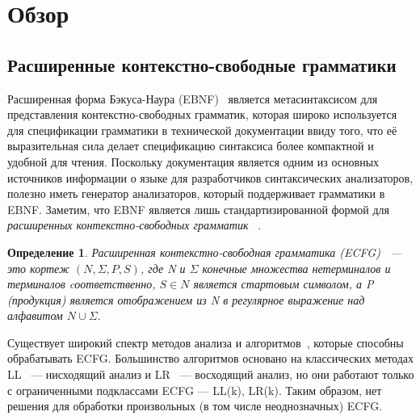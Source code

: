 \documentclass[12pt]{matmex-diploma-custom}
\newtheorem{mydef}{Определение}
\begin{document}
	\section{Обзор}
	
	\subsection{Расширенные контекстно-свободные грамматики}
	
	Расширенная форма Бэкуса-Наура (EBNF)~\cite{EBNFISO} является метасинтаксисом для представления 
	контекстно-свободных грамматик, которая широко используется для спецификации грамматики в технической документации
	ввиду того, что её выразительная сила делает спецификацию синтаксиса более компактной
	и удобной для чтения. Поскольку документация является одним из основных источников информации
	о языке для разработчиков синтаксических анализаторов, полезно иметь генератор
	анализаторов, который поддерживает грамматики в EBNF. Заметим, что EBNF является 
	лишь стандартизированной формой для \textit{расширенных контекстно-свободных грамматик}
	~\cite{ECFG}.
	
	\begin{mydef}
		Расширенная контекстно-свободная грамматика (ECFG)~\cite{ECFG} --- это кортеж $(N, \Sigma, P, S)$,
		где N и $\Sigma$ конечные множества нетерминалов и терминалов cоответственно, 
		$S\in N$ является стартовым символом, а P (продукция) является отображением из N в
		регулярное выражение над алфавитом $N \cup \Sigma$.
		
	\end{mydef}
    
	Существует широкий спектр методов анализа и алгоритмов~\cite{AttributedELL,
	ELLParser,ELL,ECFG,ELALR,ELRParsing}, которые способны обрабатывать 
	ECFG. Большинство алгоритмов основано на классических методах
	LL~\cite{ELLParser,AttributedELL} --- нисходящий анализ и LR~\cite{ELRParsing,ELALR}
    --- восходящий анализ,
	но они работают только с ограниченными подклассами ECFG ---
    LL(k), LR(k). Таким образом, нет решения 
	для обработки произвольных (в том числе неоднозначных) ECFG.
	
\end{document}
